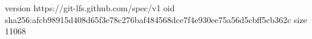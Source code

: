 version https://git-lfs.github.com/spec/v1
oid sha256:afcb98915d408d65f3e78c276baf484568dce7f4e930ee75a56d5cbff5cb362c
size 11068
